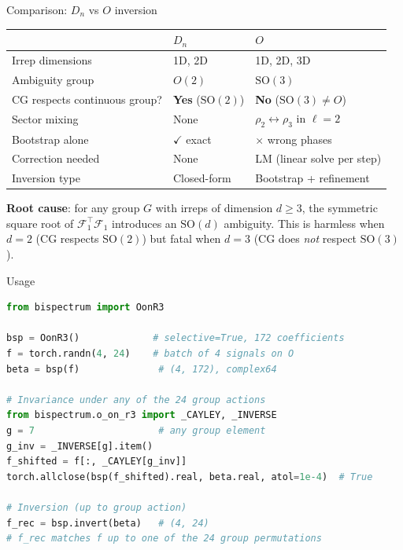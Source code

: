 \documentclass[aspectratio=169]{beamer}
\begin{document}
\begin{frame}{Comparison: $D_n$ vs $O$ inversion}
  \begin{table}
    \begin{tabular}{lll}
      \toprule
      & \textbf{$D_n$} & \textbf{$O$} \\
      \midrule
      Irrep dimensions & 1D, 2D & 1D, 2D, 3D \\
      Ambiguity group & $O(2)$ & $\mathrm{SO}(3)$ \\
      CG respects continuous group? & \textbf{Yes} ($\mathrm{SO}(2)$) & \textbf{No} ($\mathrm{SO}(3) \neq O$) \\
      Sector mixing & None & $\rho_2 \leftrightarrow \rho_3$ in $\ell{=}2$ \\
      Bootstrap alone & $\checkmark$ exact & $\times$ wrong phases \\
      Correction needed & None & LM (linear solve per step) \\
      Inversion type & Closed-form & Bootstrap + refinement \\
      \bottomrule
    \end{tabular}
  \end{table}

  \bigskip

  \textbf{Root cause}: for any group $G$ with irreps of dimension $d \geq 3$,
  the symmetric square root of $\mathcal{F}_1^\top \mathcal{F}_1$ introduces an
  $\mathrm{SO}(d)$ ambiguity. This is harmless when $d = 2$ (CG respects $\mathrm{SO}(2)$)
  but fatal when $d = 3$ (CG does \emph{not} respect $\mathrm{SO}(3)$).
\end{frame}

\begin{frame}[fragile]{Usage}
\begin{lstlisting}[language=Python]
from bispectrum import OonR3

bsp = OonR3()             # selective=True, 172 coefficients
f = torch.randn(4, 24)    # batch of 4 signals on O
beta = bsp(f)              # (4, 172), complex64

# Invariance under any of the 24 group actions
from bispectrum.o_on_r3 import _CAYLEY, _INVERSE
g = 7                      # any group element
g_inv = _INVERSE[g].item()
f_shifted = f[:, _CAYLEY[g_inv]]
torch.allclose(bsp(f_shifted).real, beta.real, atol=1e-4)  # True

# Inversion (up to group action)
f_rec = bsp.invert(beta)   # (4, 24)
# f_rec matches f up to one of the 24 group permutations
\end{lstlisting}
\end{frame}
\end{document}
